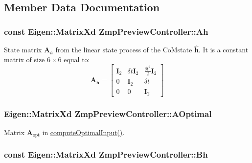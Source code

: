 \subsection{\-Member \-Data \-Documentation}
\hypertarget{classZmpPreviewController_a8ee8ec415e25374f4fa687f5a5a6b9df}{
\subsubsection[{\-Ah}]{\setlength{\rightskip}{0pt plus 5cm}const \-Eigen\-::\-Matrix\-Xd {\bf \-Zmp\-Preview\-Controller\-::\-Ah}}}\label{classZmpPreviewController_a8ee8ec415e25374f4fa687f5a5a6b9df}
\-State matrix $\mathbf{A}_h$ from the linear state process of the \-Co\-Mstate $\hat{\mathbf{h}}$. \-It is a constant matrix of size $6\times6$ equal to\-: \[ \mathbf{A_h} = \left[ \begin{array}{ccc} \mathbf{I}_2 & \delta t \mathbf{I}_2 & \frac{\delta t^2}{2} \mathbf{I}_2 \\ 0 & \mathbf{I}_2 & \delta t \\ 0 & 0 & \mathbf{I}_2 \end{array} \right] \] \hypertarget{classZmpPreviewController_a2afe60ed4923414ce4e51a8a7a584fde}{
\subsubsection[{\-A\-Optimal}]{\setlength{\rightskip}{0pt plus 5cm}\-Eigen\-::\-Matrix\-Xd {\bf \-Zmp\-Preview\-Controller\-::\-A\-Optimal}}}\label{classZmpPreviewController_a2afe60ed4923414ce4e51a8a7a584fde}
\-Matrix $\mathbf{A}_{\text{opt}}$ in \hyperlink{classZmpPreviewController_aabdafde9ecc41a6d98134e0a01083d8a}{compute\-Optimal\-Input()}. \hypertarget{classZmpPreviewController_a98bd07d03d0a6004b345ef4310cf17b6}{
\subsubsection[{\-Bh}]{\setlength{\rightskip}{0pt plus 5cm}const \-Eigen\-::\-Matrix\-Xd {\bf \-Zmp\-Preview\-Controller\-::\-Bh}}}\label{classZmpPreviewController_a98bd07d03d0a6004b345ef4310cf17b6}
